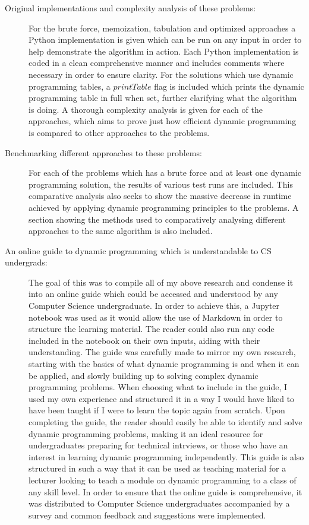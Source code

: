\begin{description}
    \item[Original implementations and complexity analysis of these problems:]
    For the brute force,
    memoization, tabulation and optimized approaches
    a Python implementation is given which can be run on any input in order to help demonstrate the algorithm in action.
    Each Python implementation is coded in a clean comprehensive manner and includes comments where necessary in order to ensure clarity.
    For the solutions which use dynamic programming tables, a $printTable$ flag is included which prints the dynamic programming table in full when set, further clarifying what the algorithm is doing.
    A thorough complexity analysis is given for each of the approaches, which aims to prove just how efficient dynamic programming is compared to other approaches to the problems.
    
    \item[Benchmarking different approaches to these problems:]
    For each of the problems which has a brute force and at least one dynamic programming solution, the results of various test runs are included.
    This comparative analysis also seeks to show the massive decrease in runtime achieved by applying dynamic programming principles to the problems.
    A section showing the methods used to comparatively analysing different approaches to the same algorithm is also included.
    
    \item[An online guide to dynamic programming which is understandable to CS undergrads:]
    The goal of this was to compile all of my above research and condense it into an online guide which could be accessed and understood by any Computer Science undergraduate.
    In order to achieve this, a Jupyter notebook was used as it would allow the use of Markdown in order to structure the learning material.
    The reader could also run any code included in the notebook on their own inputs, aiding with their understanding.
    The guide was carefully made to mirror my own research, starting with the basics of what dynamic programming is and when it can be applied, and slowly building up to solving complex dynamic programming problems.
    When choosing what to include in the guide, I used my own experience and structured it in a way I would have liked to have been taught if I were to learn the topic again from scratch.
    Upon completing the guide, the reader should easily be able to identify and solve dynamic programming problems, making it an ideal resource for undergraduates preparing for technical intrviews, or those who have an interest in learning dynamic programming independently.
    This guide is also structured in such a way that it can be used as teaching material for a lecturer looking to teach a module on dynamic programming to a class of any skill level.
    In order to ensure that the online guide is comprehensive, it was distributed to Computer Science undergraduates accompanied by a survey and common feedback and suggestions were implemented.
    

\end{description}

